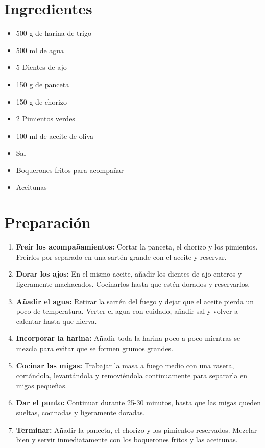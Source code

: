 
    \begin{minipage}[t]{0.35\textwidth}
        \section*{Ingredientes}
        \begin{itemize}[leftmargin=*]
            \item 500 g de harina de trigo
            \item 500 ml de agua
            \item 5 Dientes de ajo
            \item 150 g de panceta
            \item 150 g de chorizo
            \item 2 Pimientos verdes
            \item 100 ml de aceite de oliva
            \item Sal
            \item Boquerones fritos para acompañar
            \item Aceitunas
        \end{itemize}
    \end{minipage}
    \hfill
    \begin{minipage}[t]{0.6\textwidth}
        \section*{Preparación}
        \begin{enumerate}
            \item \textbf{Freír los acompañamientos:} Cortar la panceta, el chorizo y los pimientos. Freírlos por separado en una sartén grande con el aceite y reservar.
            \item \textbf{Dorar los ajos:} En el mismo aceite, añadir los dientes de ajo enteros y ligeramente machacados. Cocinarlos hasta que estén dorados y reservarlos.
            \item \textbf{Añadir el agua:} Retirar la sartén del fuego y dejar que el aceite pierda un poco de temperatura. Verter el agua con cuidado, añadir sal y volver a calentar hasta que hierva.
            \item \textbf{Incorporar la harina:} Añadir toda la harina poco a poco mientras se mezcla para evitar que se formen grumos grandes.
            \item \textbf{Cocinar las migas:} Trabajar la masa a fuego medio con una rasera, cortándola, levantándola y removiéndola continuamente para separarla en migas pequeñas.
            \item \textbf{Dar el punto:} Continuar durante 25-30 minutos, hasta que las migas queden sueltas, cocinadas y ligeramente doradas.
            \item \textbf{Terminar:} Añadir la panceta, el chorizo y los pimientos reservados. Mezclar bien y servir inmediatamente con los boquerones fritos y las aceitunas.
        \end{enumerate}
    \end{minipage}

